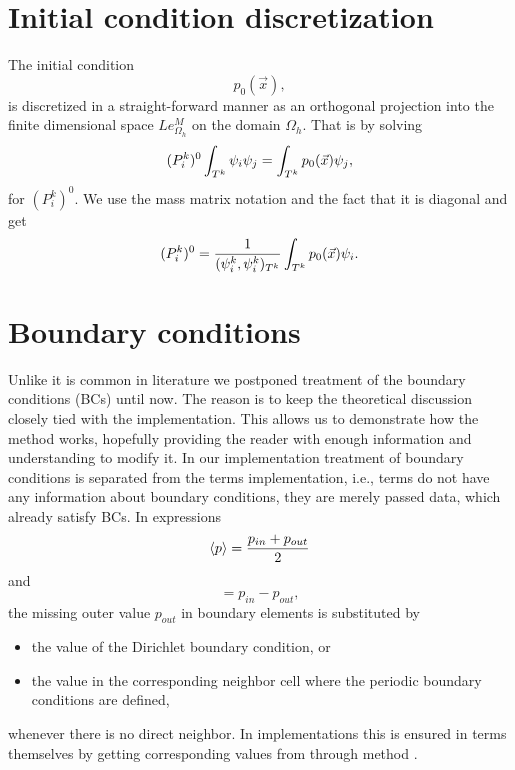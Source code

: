 \section{Initial condition discretization}
The initial condition
$$
p_0(\vec{x}),
$$
is discretized in a straight-forward manner as an orthogonal projection into the
finite dimensional space $Le_{\Omega_h}^{M}$ on the domain $\Omega_h$. That is
by solving
\begin{equation}
\label{eq:init_proj}
(P^k_i)^0\int_{T^k}\psi_i\psi_j = \int_{T^k} p_0(\vec{x})\psi_j,
\end{equation}
for $(P^k_i)^0$. We use the mass matrix notation and the fact that
it is diagonal and get
\begin{equation}
(P^k_i)^0 = \frac{1}{(\psi^k_i,\psi^k_i)_{T^k}}\int_{T^k} p_0(\vec{x})\psi_i.
\end{equation}

\section{Boundary conditions}
Unlike it is common in literature we postponed treatment of the boundary conditions (BCs)
until now. The reason is to keep the theoretical discussion
closely tied with the implementation. This allows us to demonstrate how the method works,
hopefully providing the reader with enough information and understanding to modify it. In
our implementation treatment of boundary conditions is separated from the terms implementation,
i.e., terms do not have any information about boundary conditions, they are merely passed
data, which already satisfy BCs.
In expressions
\begin{equation}
\langle p\rangle = \frac{p_{in} + p_{out}}{2}
\end{equation}
and
\begin{equation}
[p] = p_{in} - p_{out},
\end{equation}
the missing outer value $p_{out}$ in boundary elements is substituted by
\begin{itemize}
    \item the value of the Dirichlet boundary condition, or
    \item the value in the corresponding neighbor cell where the periodic boundary 
    conditions are defined,
\end{itemize}
whenever there is no direct neighbor.
In implementations this is ensured in terms themselves by getting corresponding values
from  through method .

